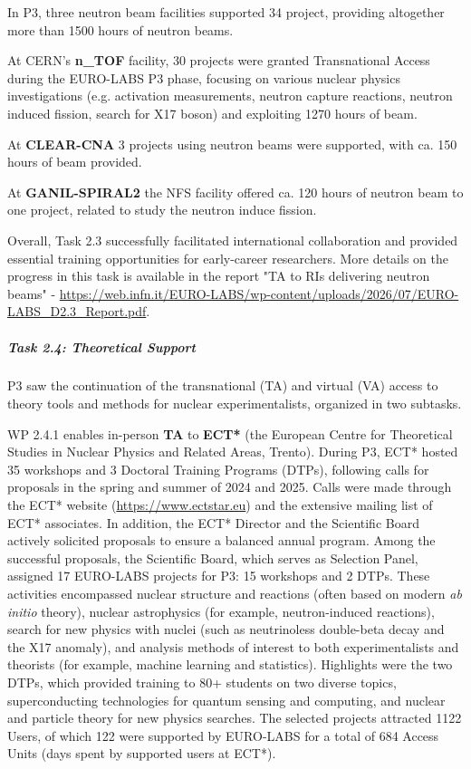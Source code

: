 In P3, three neutron beam facilities supported 34 project, providing altogether more than 1500 hours of neutron beams.



At CERN's \textbf{n\_TOF} facility, 30 projects were granted Transnational Access during the EURO-LABS P3 phase, focusing on various nuclear physics investigations (e.g. activation measurements, neutron capture reactions, neutron induced fission, search for X17 boson) and exploiting 1270 hours of beam.

At \textbf{CLEAR-CNA} 3 projects using neutron beams were supported, with  ca. 150 hours of beam provided.

At \textbf{GANIL-SPIRAL2} the NFS facility offered ca. 120 hours of neutron beam to one project, related to study the neutron induce fission.

Overall, Task 2.3 successfully facilitated international collaboration and provided essential training opportunities for early-career researchers. More details on the progress in this task is available in the report "TA to RIs delivering neutron beams" - \url{https://web.infn.it/EURO-LABS/wp-content/uploads/2026/07/EURO-LABS_D2.3_Report.pdf}.

\subparagraph{Task 2.4: Theoretical Support} \mbox{}


P3 saw the continuation of the transnational (TA) and virtual (VA) access to theory tools and methods for nuclear experimentalists, organized in two subtasks.

WP 2.4.1 enables in-person \textbf{TA} to \textbf{ECT*} (the European Centre for Theoretical Studies in Nuclear Physics and Related Areas, Trento). During P3, ECT* hosted 35 workshops and 3 Doctoral Training Programs (DTPs), following calls for proposals in the spring and summer of 2024 and 2025. Calls were made through the ECT* website (\url{https://www.ectstar.eu}) and the extensive mailing list of ECT* associates. In addition, the ECT* Director and the Scientific Board actively solicited proposals to ensure a balanced annual program. Among the successful proposals, the Scientific Board, which serves as Selection Panel, assigned 17 EURO-LABS projects for P3: 15 workshops and 2 DTPs. These activities encompassed nuclear structure and reactions (often based on modern {\it ab initio} theory), nuclear astrophysics (for example, neutron-induced reactions), search for new physics with nuclei (such as neutrinoless double-beta decay and the X17 anomaly), and analysis methods of interest to both experimentalists and theorists (for example, machine learning and statistics). Highlights were the two DTPs, which provided training to 80+ students on two diverse topics, superconducting technologies for quantum sensing and computing, and nuclear and particle theory for new physics searches. The selected projects attracted 1122 Users, of which 122 were supported by EURO-LABS for a total of 684 Access Units (days spent by supported users at ECT*). 

